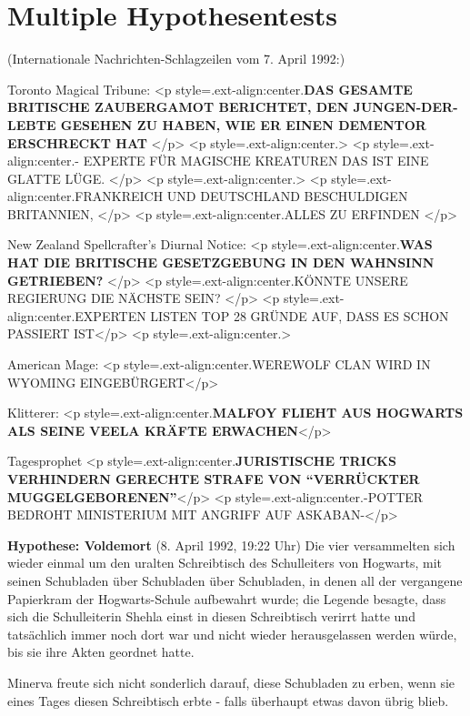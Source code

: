 \chapter{Multiple Hypothesentests}

(Internationale Nachrichten-Schlagzeilen vom 7. April 1992:)

Toronto Magical Tribune: <p style=\grqq{}.ext-align:center\grqq{}.\textbf{DAS
GESAMTE BRITISCHE ZAUBERGAMOT BERICHTET, DEN \glqq JUNGEN-DER-LEBTE\grqq{}
GESEHEN ZU HABEN, WIE ER EINEN DEMENTOR ERSCHRECKT HAT }</p> <p
style=\grqq{}.ext-align:center\grqq{}.> <p
style=\grqq{}.ext-align:center\grqq{}.- EXPERTE FÜR MAGISCHE KREATUREN \glqq DAS
IST EINE GLATTE LÜGE\grqq{}. </p> <p style=\grqq{}.ext-align:center\grqq{}.> <p
style=\grqq{}.ext-align:center\grqq{}.FRANKREICH UND DEUTSCHLAND BESCHULDIGEN
BRITANNIEN, </p> <p style=\grqq{}.ext-align:center\grqq{}.ALLES ZU ERFINDEN </p>

New Zealand Spellcrafter's Diurnal Notice: <p
style=\grqq{}.ext-align:center\grqq{}.\textbf{WAS HAT DIE BRITISCHE GESETZGEBUNG
IN DEN WAHNSINN GETRIEBEN? }</p> <p style=\grqq{}.ext-align:center\grqq{}.KÖNNTE
UNSERE REGIERUNG DIE NÄCHSTE SEIN? </p> <p
style=\grqq{}.ext-align:center\grqq{}.EXPERTEN LISTEN TOP 28 GRÜNDE AUF, DASS ES
SCHON PASSIERT IST</p> <p style=\grqq{}.ext-align:center\grqq{}.>

American Mage: <p style=\grqq{}.ext-align:center\grqq{}.WEREWOLF CLAN WIRD IN
WYOMING EINGEBÜRGERT</p>

Klitterer: <p style=\grqq{}.ext-align:center\grqq{}.\textbf{MALFOY FLIEHT AUS
HOGWARTS ALS SEINE VEELA KRÄFTE ERWACHEN}</p>

Tagesprophet <p style=\grqq{}.ext-align:center\grqq{}.\textbf{JURISTISCHE TRICKS
VERHINDERN GERECHTE STRAFE VON “VERRÜCKTER MUGGELGEBORENEN”}</p> <p
style=\grqq{}.ext-align:center\grqq{}.-POTTER BEDROHT MINISTERIUM MIT ANGRIFF
AUF ASKABAN-</p>

\textbf{Hypothese: Voldemort }(8. April 1992, 19:22 Uhr) Die vier versammelten
sich wieder einmal um den uralten Schreibtisch des Schulleiters von Hogwarts,
mit seinen Schubladen über Schubladen über Schubladen, in denen all der
vergangene Papierkram der Hogwarts-Schule aufbewahrt wurde; die Legende besagte,
dass sich die Schulleiterin Shehla einst in diesen Schreibtisch verirrt hatte
und tatsächlich immer noch dort war und nicht wieder herausgelassen werden
würde, bis sie ihre Akten geordnet hatte.

Minerva freute sich nicht sonderlich darauf, diese Schubladen zu erben, wenn sie
eines Tages diesen Schreibtisch erbte - falls überhaupt etwas davon übrig blieb.


